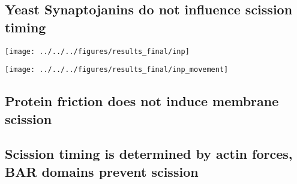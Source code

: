 	\subsection{Yeast Synaptojanins do not influence scission timing}
	\texttt{[image: ../../../figures/results\_final/inp]}
	
		\texttt{[image: ../../../figures/results\_final/inp\_movement]}
	
	\subsection{Protein friction does not induce membrane scission }
	\subsection{Scission timing is determined by actin forces, \\
		BAR domains prevent scission}